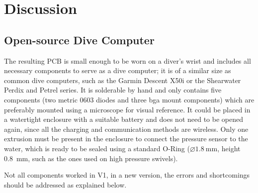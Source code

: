 
\chapter{Discussion}

\section{Open-source Dive Computer}
The resulting PCB is small enough to be worn on a diver's wrist and includes all necessary components to serve as a dive computer; it is of a similar size as common dive computers, such as the Garmin Descent X50i or the Shearwater Perdix and Petrel series.
It is solderable by hand and only contains five components (two metric 0603 diodes and three \gls{bga} mount components) which are preferably mounted using a microscope for visual reference.
It could be placed in a watertight enclosure with a suitable battery and does not need to be opened again, since all the charging and communication methods are wireless. 
Only one extrusion must be present in the enclosure to connect the pressure sensor to the water, which is ready to be sealed using a standard O-Ring ($\diameter\SI{1.8}{\milli\meter}$, height \SI{0.8}{\milli\meter}, such as the ones used on high pressure swivels).

Not all components worked in V1, in a new version, the errors and shortcomings should be addressed as explained below.

